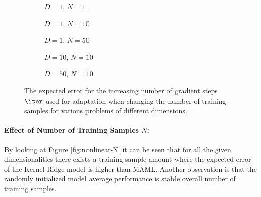 \begin{figure}[!htb]
  \centering
    \begin{subfigure}{0.3\textwidth}
      \centering
      \caption{$D=1$, $N=1$}
      \label{fig:nonlinear-n_iter-N-1-D-1}
    \end{subfigure}
    \begin{subfigure}{0.3\textwidth}
      \centering
      \caption{$D=1$, $N=10$}
      \label{fig:nonlinear-n_iter-N-10-D-1}
    \end{subfigure}
    \begin{subfigure}{0.3\textwidth}
      \centering
      \caption{$D=1$, $N=50$}
      \label{fig:nonlinear-n_iter-N-50-D-1}
    \end{subfigure}

    \begin{subfigure}{0.3\textwidth}
      \centering
      \caption{$D=10$, $N=10$}
      \label{fig:nonlinear-n_iter-N-10-D-10}
    \end{subfigure}
    \begin{subfigure}{0.3\textwidth}
      \centering
      \caption{$D=50$, $N=10$}
      \label{fig:nonlinear-n_iter-N-10-D-50}
    \end{subfigure}  
  \caption{The expected error for the increasing number of gradient steps $\iter$ used for adaptation when changing the number of training samples for various problems of different dimensions.}
  \label{fig:nonlinear-n_iter}
\end{figure}


\paragraph{Effect of Number of Training Samples $N$:} By looking at Figure \ref{fig:nonlinear-N} it can be seen that for all the given dimensionalities there exists a training sample amount where the expected error of the Kernel Ridge model is higher than MAML. Another observation is that the randomly initialized model average performance is stable overall number of training samples. 

